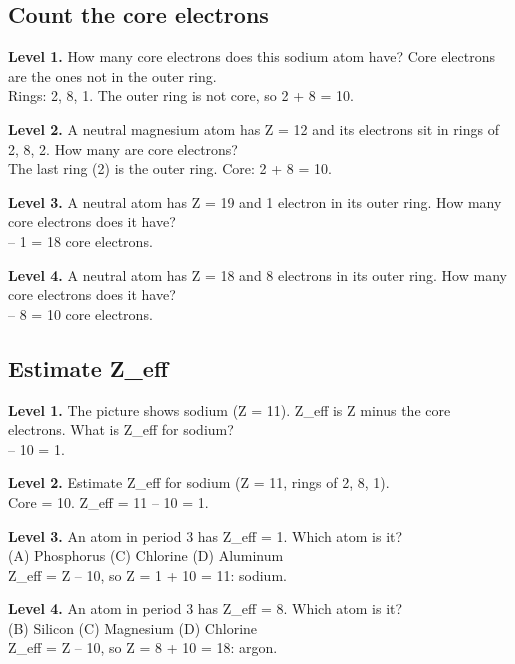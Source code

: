 \documentclass[11pt]{article}
\begin{document}
\subsection*{Count the core electrons}
\noindent\textbf{Level 1.} How many core electrons does this sodium atom have? Core electrons are the ones not in the outer ring.\\  \quad Rings: 2, 8, 1. The outer ring is not core, so 2 + 8 = 10.\par\medskip
\noindent\textbf{Level 2.} A neutral magnesium atom has Z = 12 and its electrons sit in rings of 2, 8, 2. How many are core electrons?\\  \quad The last ring (2) is the outer ring. Core: 2 + 8 = 10.\par\medskip
\noindent\textbf{Level 3.} A neutral atom has Z = 19 and 1 electron in its outer ring. How many core electrons does it have?\\   -- 1 = 18 core electrons.\par\medskip
\noindent\textbf{Level 4.} A neutral atom has Z = 18 and 8 electrons in its outer ring. How many core electrons does it have?\\   -- 8 = 10 core electrons.\par\medskip
\subsection*{Estimate Z\_eff}
\noindent\textbf{Level 1.} The picture shows sodium (Z = 11). Z\_eff is Z minus the core electrons. What is Z\_eff for sodium?\\   -- 10 = 1.\par\medskip
\noindent\textbf{Level 2.} Estimate Z\_eff for sodium (Z = 11, rings of 2, 8, 1).\\  \quad Core = 10. Z\_eff = 11 -- 10 = 1.\par\medskip
\noindent\textbf{Level 3.} An atom in period 3 has Z\_eff = 1. Which atom is it?\\ (A) Phosphorus \quad {} \quad (C) Chlorine \quad (D) Aluminum\\  \quad Z\_eff = Z -- 10, so Z = 1 + 10 = 11: sodium.\par\medskip
\noindent\textbf{Level 4.} An atom in period 3 has Z\_eff = 8. Which atom is it?\\  \quad (B) Silicon \quad (C) Magnesium \quad (D) Chlorine\\  \quad Z\_eff = Z -- 10, so Z = 8 + 10 = 18: argon.\par\medskip
\end{document}
